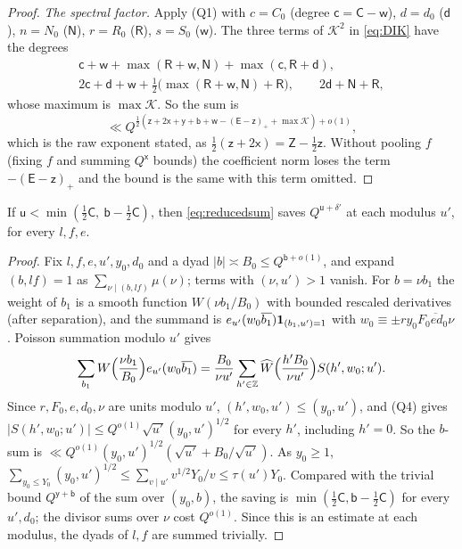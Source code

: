 \documentclass[11pt,colorlinks]{charlie}
\begin{document}
\begin{proof}
\emph{The spectral factor.} Apply (Q1) with $c=C_0$ (degree $\mathsf c=\mathsf C-\mathsf w$), $d=d_0$ ($\mathsf d$), $n=N_0$ ($\mathsf N$), $r=R_0$ ($\mathsf R$), $s=S_0$ ($\mathsf w$). The three terms of $\mathcal K^2$ in \eqref{eq:DIK} have the degrees
\begin{gather*}
 \mathsf c+\mathsf w+\max(\mathsf R+\mathsf w,\mathsf N)+\max(\mathsf c,\mathsf R+\mathsf d),\\
 2\mathsf c+\mathsf d+\mathsf w+\tfrac12\big(\max(\mathsf R+\mathsf w,\mathsf N)+\mathsf R\big),\qquad2\mathsf d+\mathsf N+\mathsf R,
\end{gather*}
whose maximum is $\max\mathcal K$. So the sum is
\[
 \ll Q^{\frac12(\mathsf z+2\mathsf x+\mathsf y+\mathsf b+\mathsf w-(\mathsf E-\mathsf z)_++\max\mathcal K)+o(1)},
\] which is the raw exponent stated, as $\frac12(\mathsf z+2\mathsf x)=\mathsf Z-\frac12\mathsf z$. Without pooling $f$ (fixing $f$ and summing $Q^{\mathsf x}$ bounds) the coefficient norm loses the term $-(\mathsf E-\mathsf z)_+$ and the bound is the same with this term omitted.
\end{proof}

\begin{lemma}\label{lem:recip}
If $\mathsf u<\min(\frac12\mathsf C,\ \mathsf b-\frac12\mathsf C)$, then \eqref{eq:reducedsum} saves $Q^{\mathsf u+\delta'}$ at each modulus $u'$, for every $l,f,e$.
\end{lemma}
\begin{proof}
Fix $l,f,e,u',y_0,d_0$ and a dyad $|b|\asymp B_0\le Q^{\mathsf b+o(1)}$, and expand $(b,lf)=1$ as $\sum_{\nu\mid(b,lf)}\mu(\nu)$; terms with $(\nu,u')>1$ vanish. For $b=\nu b_1$ the weight of $b_1$ is a smooth function $W(\nu b_1/B_0)$ with bounded rescaled derivatives (after separation), and the summand is $e_{u'}(w_0\overline{b_1})\mathbf{1}_{(b_1,u')=1}$ with $w_0\equiv\pm ry_0\overline{F_0ed_0\nu}$. Poisson summation modulo $u'$ gives
\[
 \sum_{b_1}W\Big(\frac{\nu b_1}{B_0}\Big)e_{u'}(w_0\overline{b_1})=\frac{B_0}{\nu u'}\sum_{h'\in\mathbb{Z}}\widehat W\Big(\frac{h'B_0}{\nu u'}\Big)S(h',w_0;u').
\]
Since $r,F_0,e,d_0,\nu$ are units modulo $u'$, $(h',w_0,u')\le(y_0,u')$, and (Q4) gives $|S(h',w_0;u')|\le Q^{o(1)}\sqrt{u'}(y_0,u')^{1/2}$ for every $h'$, including $h'=0$. So the $b$-sum is $\ll Q^{o(1)}(y_0,u')^{1/2}(\sqrt{u'}+B_0/\sqrt{u'})$. As $y_0\ge1$, $\sum_{y_0\le Y_0}(y_0,u')^{1/2}\le\sum_{v\mid u'}v^{1/2}Y_0/v\le\tau(u')Y_0$. Compared with the trivial bound $Q^{\mathsf y+\mathsf b}$ of the sum over $(y_0,b)$, the saving is $\min(\frac12\mathsf C,\mathsf b-\frac12\mathsf C)$ for every $u',d_0$; the divisor sums over $\nu$ cost $Q^{o(1)}$. Since this is an estimate at each modulus, the dyads of $l,f$ are summed trivially.
\end{proof}
\end{document}
